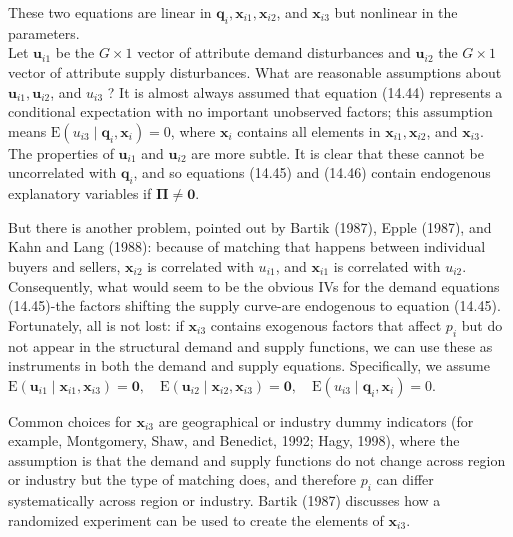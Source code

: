 \documentclass[10pt]{article}
\begin{document}
These two equations are linear in $\mathbf{q}_{i}, \mathbf{x}_{i 1}, \mathbf{x}_{i 2}$, and $\mathbf{x}_{i 3}$ but nonlinear in the parameters.\\
Let $\mathbf{u}_{i 1}$ be the $G \times 1$ vector of attribute demand disturbances and $\mathbf{u}_{i 2}$ the $G \times 1$ vector of attribute supply disturbances. What are reasonable assumptions about $\mathbf{u}_{i 1}, \mathbf{u}_{i 2}$, and $u_{i 3}$ ? It is almost always assumed that equation (14.44) represents a conditional expectation with no important unobserved factors; this assumption means $\mathrm{E}\left(u_{i 3} \mid \mathbf{q}_{i}, \mathbf{x}_{i}\right)=0$, where $\mathbf{x}_{i}$ contains all elements in $\mathbf{x}_{i 1}, \mathbf{x}_{i 2}$, and $\mathbf{x}_{i 3}$. The properties of $\mathbf{u}_{i 1}$ and $\mathbf{u}_{i 2}$ are more subtle. It is clear that these cannot be uncorrelated with $\mathbf{q}_{i}$, and so equations (14.45) and (14.46) contain endogenous explanatory variables if $\boldsymbol{\Pi} \neq \mathbf{0}$.

But there is another problem, pointed out by Bartik (1987), Epple (1987), and Kahn and Lang (1988): because of matching that happens between individual buyers and sellers, $\mathbf{x}_{i 2}$ is correlated with $u_{i 1}$, and $\mathbf{x}_{i 1}$ is correlated with $u_{i 2}$. Consequently, what would seem to be the obvious IVs for the demand equations (14.45)-the factors shifting the supply curve-are endogenous to equation (14.45). Fortunately, all is not lost: if $\mathbf{x}_{i 3}$ contains exogenous factors that affect $p_{i}$ but do not appear in the structural demand and supply functions, we can use these as instruments in both the demand and supply equations. Specifically, we assume\\
$\mathrm{E}\left(\mathbf{u}_{i 1} \mid \mathbf{x}_{i 1}, \mathbf{x}_{i 3}\right)=\mathbf{0}, \quad \mathrm{E}\left(\mathbf{u}_{i 2} \mid \mathbf{x}_{i 2}, \mathbf{x}_{i 3}\right)=\mathbf{0}, \quad \mathrm{E}\left(u_{i 3} \mid \mathbf{q}_{i}, \mathbf{x}_{i}\right)=0$.

Common choices for $\mathbf{x}_{i 3}$ are geographical or industry dummy indicators (for example, Montgomery, Shaw, and Benedict, 1992; Hagy, 1998), where the assumption is that the demand and supply functions do not change across region or industry but the type of matching does, and therefore $p_{i}$ can differ systematically across region or industry. Bartik (1987) discusses how a randomized experiment can be used to create the elements of $\mathbf{x}_{i 3}$.
\end{document}
